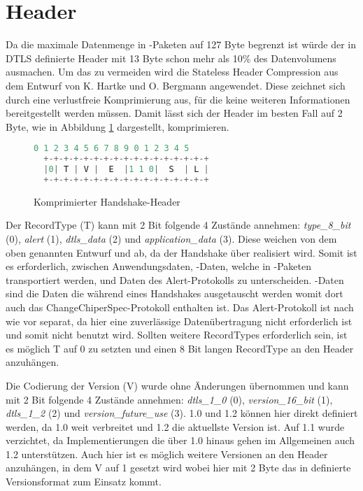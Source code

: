 \section{Header}

Da die maximale Datenmenge in -Paketen auf 127 Byte begrenzt ist würde der in DTLS definierte Header mit 13 Byte schon mehr als 10\% des
Datenvolumens ausmachen. Um das zu vermeiden wird die Stateless Header Compression aus dem Entwurf von K. Hartke und O. Bergmann \cite{draftcodtls}
angewendet. Diese zeichnet sich durch eine verlustfreie Komprimierung aus, für die keine weiteren Informationen bereitgestellt werden müssen. Damit
lässt sich der Header im besten Fall auf 2 Byte, wie in Abbildung \ref{fig:com_handshake_header} dargestellt, komprimieren.

\begin{figure}[ht]
  \centering
  \begin{lstlisting}[language=c]
   0 1 2 3 4 5 6 7 8 9 0 1 2 3 4 5
  +-+-+-+-+-+-+-+-+-+-+-+-+-+-+-+-+
  |0| T | V |  E  |1 1 0|  S  | L |
  +-+-+-+-+-+-+-+-+-+-+-+-+-+-+-+-+
  \end{lstlisting}
  \caption{Komprimierter Handshake-Header}
  \label{fig:com_handshake_header}
\end{figure}

Der RecordType (T) kann mit 2 Bit folgende 4 Zustände annehmen: \textit{type\_8\_bit} (0), \textit{alert} (1), \textit{dtls\_data} (2) und \textit{application\_data} (3).
Diese weichen von dem oben genannten Entwurf und  ab, da der Handshake über  realisiert wird. Somit ist es erforderlich, zwischen
Anwendungsdaten, -Daten, welche in -Paketen transportiert werden, und Daten des Alert-Protokolls zu unterscheiden. -Daten sind die
Daten die während eines Handshakes ausgetauscht werden womit dort auch das ChangeChiperSpec-Protokoll enthalten ist. Das Alert-Protokoll ist nach wie vor separat,
da hier eine zuverlässige Datenübertragung nicht erforderlich ist und  somit nicht benutzt wird. Sollten weitere RecordTypes erforderlich sein, ist es möglich
T auf 0 zu setzten und einen 8 Bit langen RecordType an den Header anzuhängen.

Die Codierung der Version (V) wurde ohne Änderungen übernommen und kann mit 2 Bit folgende 4 Zustände annehmen: \textit{dtls\_1\_0} (0), \textit{version\_16\_bit} (1),
\textit{dtls\_1\_2} (2) und \textit{version\_future\_use} (3).  1.0 und  1.2 können hier direkt definiert werden, da  1.0 weit verbreitet
 und  1.2 die aktuellste Version ist. Auf  1.1 wurde verzichtet, da Implementierungen die über  1.0 hinaus gehen im Allgemeinen auch
 1.2 unterstützen. Auch hier ist es möglich weitere Versionen an den Header anzuhängen, in dem V auf 1 gesetzt wird wobei hier mit 2 Byte das in 
definierte Versionsformat zum Einsatz kommt.

